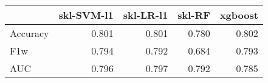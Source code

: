 \begin{tabular}{lrrrr}
\toprule
{} &  skl-SVM-l1 &  skl-LR-l1 &  skl-RF &  xgboost \\
\midrule
Accuracy &       0.801 &      0.801 &   0.780 &    0.802 \\
F1w      &       0.794 &      0.792 &   0.684 &    0.793 \\
AUC      &       0.796 &      0.797 &   0.792 &    0.785 \\
\bottomrule
\end{tabular}
